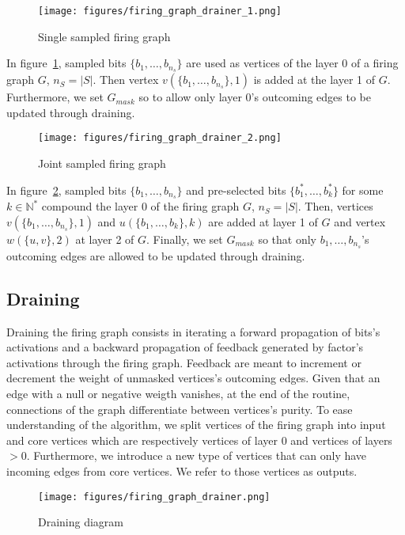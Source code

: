 \documentclass[a4paper, 11pt]{article}
\begin{document}
\begin{figure}[H]
\centering
\texttt{[image: figures/firing\_graph\_drainer\_1.png]}
\caption{Single sampled firing graph}
\label{fig:single_sampled_fg}
\end{figure}

In figure~\ref{fig:single_sampled_fg}, sampled bits $\{b_1, \ldots, b_{n_s}\}$ are used as vertices of the layer 0 of a firing graph $G$, $n_S = \vert S \vert$. Then vertex $v(\{b_1, \ldots, b_{n_s}\}, 1)$ is added at the layer 1 of $G$. Furthermore, we set $G_{mask}$ so to allow only layer 0's outcoming edges to be updated through draining.

\begin{figure}[H]
\centering
\texttt{[image: figures/firing\_graph\_drainer\_2.png]}
\caption{Joint sampled firing graph}
\label{fig:joint_sampled_fg}
\end{figure}

In figure~\ref{fig:joint_sampled_fg}, sampled bits $\{b_1, \ldots, b_{n_s}\}$ and pre-selected bits $\{b_1^{*}, \ldots, b_k^{*} \}$ for some $k \in \mathbb{N}^{*}$ compound the layer 0 of the firing graph $G$, $n_S = \vert S \vert$. Then, vertices $v(\{b_1, \ldots, b_{n_s}\}, 1)$ and $u(\{b_1, \ldots, b_{k}\}, k)$ are added at layer 1 of $G$ and vertex $w(\{u, v\}, 2)$ at layer 2 of $G$. Finally, we set $G_{mask}$ so that only $b_1, \ldots, b_{n_s}$'s outcoming edges are allowed to be updated through  draining.

\subsection{Draining}

Draining the firing graph consists in iterating a forward propagation of bits's activations and a backward propagation of feedback generated by factor's activations through the firing graph. Feedback are meant to increment or decrement the weight of unmasked vertices's outcoming edges. Given that an edge with a null or negative weigth vanishes, at the end of the routine, connections of the graph differentiate between vertices's purity. To ease understanding of the algorithm, we split vertices of the firing graph into input and core vertices which are respectively vertices of layer 0 and vertices of layers $> 0$. Furthermore, we introduce a new type of vertices that can only have incoming edges from core vertices. We refer to those vertices as outputs. 

\begin{figure}[H]
\centering
\texttt{[image: figures/firing\_graph\_drainer.png]}
\caption{Draining diagram}
\label{fig:draining_diagram}   
\end{figure}
\end{document}
